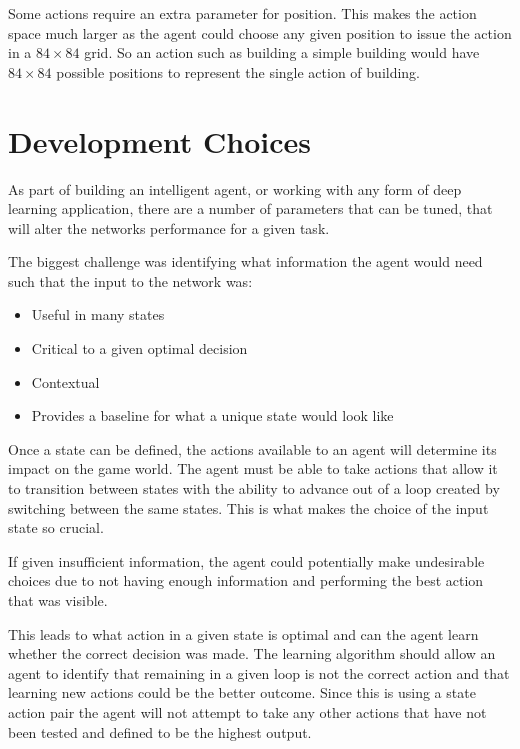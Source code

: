Some actions require an extra parameter for position.
This makes the action space much larger as the agent could choose any given
position to issue the action in a $84 \times 84$ grid.
So an action such as building a simple building would have $84 \times 84$
possible positions to represent the single action of building.

\section{Development Choices}

As part of building an intelligent agent, or working with any form of deep learning application,
there are a number of parameters that can be tuned, that will alter the networks performance
for a given task.

The biggest challenge was identifying what information the agent would need such that the
input to the network was:

\begin{itemize}
    \item Useful in many states
    \item Critical to a given optimal decision
    \item Contextual
    \item Provides a baseline for what a unique state would look like
\end{itemize}

Once a state can be defined, the actions available to an agent will determine its
impact on the game world. The agent must be able to take actions that allow it to
transition between states with the ability to advance out of a loop created
by switching between the same states. This is what makes the choice of the input
state so crucial.

If given insufficient information, the agent could potentially make undesirable
choices due to not having enough information and performing the best
action that was visible.

This leads to what action in a given state is optimal and can the agent learn whether
the correct decision was made. The learning algorithm should allow an agent
to identify that remaining in a given loop is not the correct action and that learning
new actions could be the better outcome.
Since this is using a state action pair the agent will not attempt to take any
other actions that have not been tested and defined to be the highest output.
